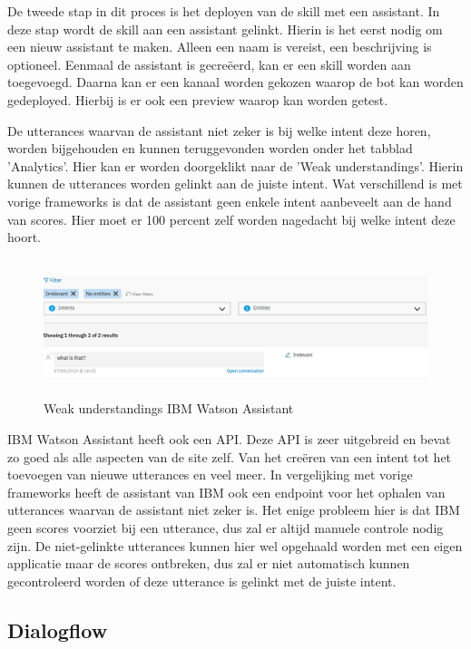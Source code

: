 De tweede stap in dit proces is het deployen van de skill met een assistant. In deze stap wordt de skill aan een assistant gelinkt. Hierin is het eerst nodig om een nieuw assistant te maken. Alleen een naam is vereist, een beschrijving is optioneel. Eenmaal de assistant is gecreëerd, kan er een skill worden aan toegevoegd. Daarna kan er een kanaal worden gekozen waarop de bot kan worden gedeployed. Hierbij is er ook een preview waarop kan worden getest.

De utterances waarvan de assistant niet zeker is bij welke intent deze horen, worden bijgehouden en kunnen teruggevonden worden onder het tabblad 'Analytics'. Hier kan er worden doorgeklikt naar de 'Weak understandings'. Hierin kunnen de utterances worden gelinkt aan de juiste intent. Wat verschillend is met vorige frameworks is dat de assistant geen enkele intent aanbeveelt aan de hand van scores. Hier moet er 100 percent zelf worden nagedacht bij welke intent deze hoort.

\begin{figure}[h!]
	\centering
	\includegraphics[height=4cm]{img/weak.png}
	\caption{Weak understandings IBM Watson Assistant}
	\label{fig:weak}
\end{figure}

IBM Watson Assistant heeft ook een API. Deze API is zeer uitgebreid en bevat zo goed als alle aspecten van de site zelf. Van het creëren van een intent tot het toevoegen van nieuwe utterances en veel meer. In vergelijking met vorige frameworks heeft de assistant van IBM ook een endpoint voor het ophalen van utterances waarvan de assistant niet zeker is. Het enige probleem hier is dat IBM geen scores voorziet bij een utterance, dus zal er altijd manuele controle nodig zijn. De niet-gelinkte utterances kunnen hier wel opgehaald worden met een eigen applicatie maar de scores ontbreken, dus zal er niet automatisch kunnen gecontroleerd worden of deze utterance is gelinkt met de juiste intent.

\subsection{Dialogflow}
\label{dialogflow}

